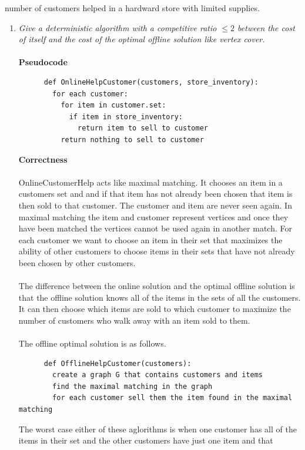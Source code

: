 \documentclass[12pt]{article}
\begin{document}
\begin{enumerate}
{  number of customers helped in a hardward store with limited supplies.}
    \begin{enumerate}
      \item \textit{Give a deterministic algorithm with a competitive ratio
      $\le 2$ between the cost of itself and the cost of the optimal offline
      solution like vertex cover.}\\
      \\
      \textbf{Pseudocode}
      \begin{verbatim}
      def OnlineHelpCustomer(customers, store_inventory):
        for each customer:
          for item in customer.set:
            if item in store_inventory:
              return item to sell to customer
          return nothing to sell to customer
      \end{verbatim}
      \textbf{Correctness}\\
      \\
      OnlineCustomerHelp acts like maximal matching.  It chooses
      an item in a customers set and and if that item has not already been
      chosen that item is then sold to that customer.  The customer and item are
      never seen again. In maximal matching the item and customer represent
      vertices and once they have been matched the vertices cannot be used again
      in another match.  For each customer we want to choose an item in their
      set that maximizes the ability of other customers to choose items in
      their sets that have not already been chosen by other customers.\\
      \\
      The difference between the online solution and the optimal offline
      solution is that the offline solution knows all of the items in the sets
      of all the customers.  It can then choose which items are sold to which
      customer to maximize the number of customers who walk away with an item sold to them.\\
      \\
      The offline optimal solution is as follows.  
      \begin{verbatim}
      def OfflineHelpCustomer(customers):
        create a graph G that contains customers and items
        find the maximal matching in the graph
        for each customer sell them the item found in the maximal matching
      \end{verbatim}
      The worst case either of these aglorithms is when one customer has all of
      the items in their set and the other customers have just one item and that

\end{enumerate}
\end{enumerate}
\end{document}

